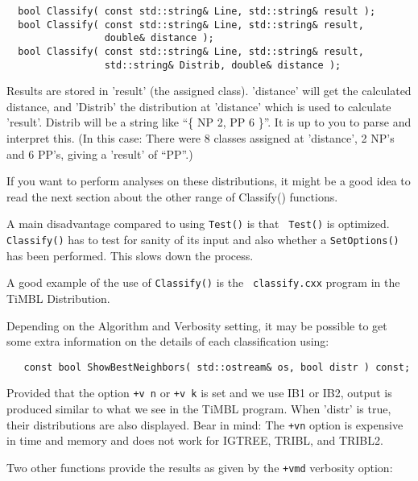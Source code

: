 \documentclass{report}
\begin{document}
\begin{footnotesize}
\begin{verbatim}
  bool Classify( const std::string& Line, std::string& result );
  bool Classify( const std::string& Line, std::string& result, 
                 double& distance );
  bool Classify( const std::string& Line, std::string& result,
                 std::string& Distrib, double& distance );
\end{verbatim}
\end{footnotesize}

Results are stored in 'result' (the assigned class). 'distance' will
get the calculated distance, and 'Distrib' the distribution at
'distance' which is used to calculate 'result'.  Distrib will be a
string like ``\{ NP 2, PP 6 \}''. It is up to you to parse and
interpret this. (In this case: There were 8 classes assigned at
'distance', 2 NP's and 6 PP's, giving a 'result' of ``PP''.)

If you want to perform analyses on these distributions, it might be a
good idea to read the next section about the other range of Classify()
functions.

A main disadvantage compared to using {\tt Test()} is that {\tt
  Test()} is optimized.  {\tt Classify()} has to test for sanity of
its input and also whether a {\tt SetOptions()} has been
performed. This slows down the process.

A good example of the use of {\tt Classify()} is the {\tt
 classify.cxx} program in the TiMBL Distribution.

Depending on the Algorithm and Verbosity setting, it may be possible
to get some extra information on the details of each classification
using:

\begin{footnotesize}
\begin{verbatim}
   const bool ShowBestNeighbors( std::ostream& os, bool distr ) const;
\end{verbatim}
\end{footnotesize}

Provided that the option {\tt +v n} or {\tt +v k} is set and we use
IB1 or IB2, output is produced similar to what we see in the TiMBL
program.  When 'distr' is true, their distributions are also
displayed.  Bear in mind: The {\tt +vn} option is expensive in time
and memory and does not work for IGTREE, TRIBL, and TRIBL2.

Two other functions provide the results as given by the {\tt +vmd} verbosity 
option:
\end{document}
